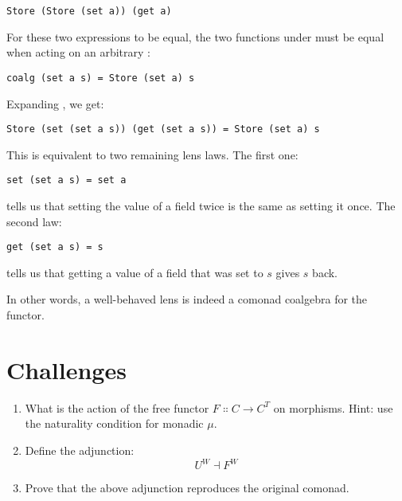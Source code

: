 \begin{Verbatim}
Store (Store (set a)) (get a)
\end{Verbatim}
For these two expressions to be equal, the two functions under
 must be equal when acting on an arbitrary :

\begin{Verbatim}
coalg (set a s) = Store (set a) s
\end{Verbatim}
Expanding , we get:

\begin{Verbatim}
Store (set (set a s)) (get (set a s)) = Store (set a) s
\end{Verbatim}
This is equivalent to two remaining lens laws. The first one:

\begin{Verbatim}
set (set a s) = set a
\end{Verbatim}
tells us that setting the value of a field twice is the same as setting
it once. The second law:

\begin{Verbatim}
get (set a s) = s
\end{Verbatim}
tells us that getting a value of a field that was set to $s$
gives $s$ back.

In other words, a well-behaved lens is indeed a comonad coalgebra for
the  functor.

\section{Challenges}

\begin{enumerate}
\tightlist
\item
  What is the action of the free functor
  $F \Colon C \to C^T$ on morphisms. Hint: use the
  naturality condition for monadic $\mu$.
\item
  Define the adjunction:
\[U^W \dashv F^W\]
\item
  Prove that the above adjunction reproduces the original comonad.
\end{enumerate}